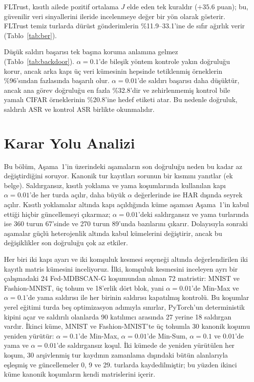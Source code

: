 \documentclass[journal]{IEEEtran}
\begin{document}
FLTrust, kısıtlı ailede pozitif ortalama $J$ elde eden tek kuraldır ($+35.6$ puan); bu, güvenilir veri sinyallerini ileride incelenmeye değer bir yön olarak gösterir. FLTrust temiz turlarda dürüst gönderimlerin \%11.9--33.1'ine de sıfır ağırlık verir (Tablo~\ref{tab:ber}).


Düşük saldırı başarısı tek başına koruma anlamına gelmez (Tablo~\ref{tab:backdoor}). $\alpha=0.1$'de bileşik yöntem kontrole yakın doğruluğu korur, ancak arka kapı üç veri kümesinin hepsinde tetiklenmiş örneklerin \%96'sından fazlasında başarılı olur. $\alpha=0.01$'de saldırı başarısı daha düşüktür, ancak ana görev doğruluğu en fazla \%32.8'dir ve zehirlenmemiş kontrol bile yamalı CIFAR örneklerinin \%20.8'ine hedef etiketi atar. Bu nedenle doğruluk, saldırılı ASR ve kontrol ASR birlikte okunmalıdır.

\section{Karar Yolu Analizi}\label{sec:mechanism}
Bu bölüm, Aşama~1'in üzerindeki aşamaların son doğruluğu neden bu kadar az değiştirdiğini soruyor. Kanonik tur kayıtları sorunun bir kısmını yanıtlar (ek belge). Saldırgansız, kısıtlı yoklama ve yama koşumlarında kullanılan kapı $\alpha=0.01$'de her turda açılır, daha büyük $\alpha$ değerlerinde ise HAR dışında seyrek açılır. Kısıtlı yoklamalar altında kapı açıldığında küme aşaması Aşama~1'in kabul ettiği hiçbir güncellemeyi çıkarmaz; $\alpha=0.01$'deki saldırgansız ve yama turlarında ise 360 turun 67'sinde ve 270 turun 89'unda bazılarını çıkarır. Dolayısıyla sonraki aşamalar güçlü heterojenlik altında kabul kümelerini değiştirir, ancak bu değişiklikler son doğruluğu çok az etkiler.

Her biri iki kapı ayarı ve iki komşuluk kesmesi seçeneği altında değerlendirilen iki kayıtlı matris kümesini inceliyoruz. İlki, komşuluk kesmesini inceleyen ayrı bir çalışmadaki 24 Fed-MDBSCAN-G koşumundan alınan 72 matristir: MNIST ve Fashion-MNIST, üç tohum ve 18'erlik dört blok, yani $\alpha=0.01$'de Min-Max ve $\alpha=0.1$'de yama saldırısı ile her birinin saldırısı kapatılmış kontrolü. Bu koşumlar yerel eğitimi turda beş optimizasyon adımıyla sınırlar, PyTorch'un deterministik kipini açar ve saldırılı olanlarda 90 katılımcı arasında 27 yerine 18 saldırgan vardır. İkinci küme, MNIST ve Fashion-MNIST'te üç tohumla 30 kanonik koşumu yeniden yürütür: $\alpha=0.1$'de Min-Max, $\alpha=0.01$'de Min-Sum, $\alpha=0.1$ ve $0.01$'de yama ve $\alpha=0.01$'de saldırgansız koşul. İki kümede de yeniden yürütülen her koşum, 30 arşivlenmiş tur kaydının zamanlama dışındaki bütün alanlarıyla eşleşmiş ve güncellemeler 0, 9 ve 29. turlarda kaydedilmiştir; bu yüzden ikinci küme kanonik koşumların kendi matrislerini içerir.
\end{document}

